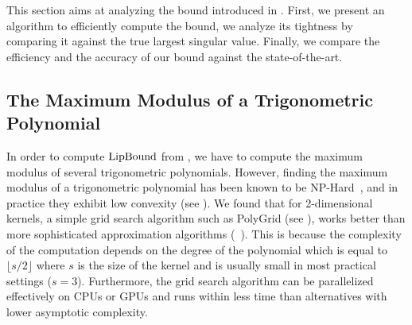 This section aims at analyzing the bound introduced in .
First, we present an algorithm to efficiently compute the bound, we analyze its tightness by comparing it against the true largest singular value.
Finally, we compare the efficiency and the accuracy of our bound against the state-of-the-art. 

\subsection{The Maximum Modulus of a Trigonometric Polynomial}
\label{subsection:ch5-computing_the_maximum_modulus_of_a_trigonometric_polynomial}

In order to compute $\mathrm{LipBound}$ from , we have to compute the maximum modulus of several trigonometric polynomials.
However, finding the maximum modulus of a trigonometric polynomial has been known to be NP-Hard~\cite{pfister2018bounding}, and in practice they exhibit low convexity (see ).
We found that for 2-dimensional kernels, a simple grid search algorithm such as PolyGrid (see ), works better than more sophisticated approximation algorithms (\eg ~\citet{green1999calculating,de2009finding}).
This is because the complexity of the computation depends on the degree of the polynomial which is equal to $\lfloor s / 2 \rfloor$ where $s$ is the size of the kernel and is usually small in most practical settings (\eg $s=3$).
Furthermore, the grid search algorithm can be parallelized effectively on CPUs or GPUs and runs within less time than alternatives with lower asymptotic complexity. 

